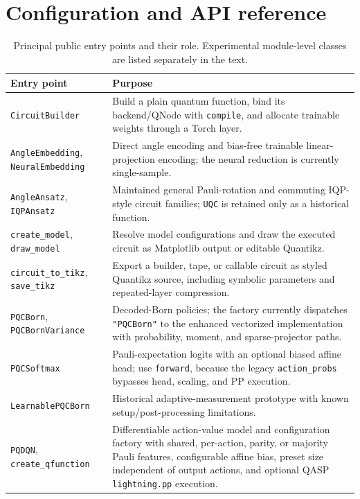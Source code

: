 \documentclass[10pt]{article}
\renewcommand{\arraystretch}{1.15}
\newcommand{\code}[1]{\texttt{#1}}
\begin{document}



\clearpage
\appendix

\section{Configuration and API reference}
\label{app:api}

\begin{table}[H]
\centering
\caption{Principal public entry points and their role.  Experimental module-level classes are listed separately in the text.}
\scriptsize
\renewcommand{\arraystretch}{1.03}
\begin{tabularx}{\textwidth}{@{}p{}X@{}}
\toprule
Entry point & Purpose \\
\midrule
\code{CircuitBuilder} & Build a plain quantum function, bind its backend/QNode with \code{compile}, and allocate trainable weights through a Torch layer. \\
\code{AngleEmbedding}, \code{NeuralEmbedding} & Direct angle encoding and bias-free trainable linear-projection encoding; the neural reduction is currently single-sample. \\
\code{AngleAnsatz}, \code{IQPAnsatz} & Maintained general Pauli-rotation and commuting IQP-style circuit families; \code{UQC} is retained only as a historical function. \\
\code{create\_model}, \code{draw\_model} & Resolve model configurations and draw the executed circuit as Matplotlib output or editable Quantikz. \\
\code{circuit\_to\_tikz}, \code{save\_tikz} & Export a builder, tape, or callable circuit as styled Quantikz source, including symbolic parameters and repeated-layer compression. \\
\code{PQCBorn}, \code{PQCBornVariance} & Decoded-Born policies; the factory currently dispatches \code{"PQCBorn"} to the enhanced vectorized implementation with probability, moment, and sparse-projector paths. \\
\code{PQCSoftmax} & Pauli-expectation logits with an optional biased affine head; use \code{forward}, because the legacy \code{action\_probs} bypasses head, scaling, and PP execution. \\
\code{LearnablePQCBorn} & Historical adaptive-measurement prototype with known setup/post-processing limitations. \\
\code{PQDQN}, \code{create\_qfunction} & Differentiable action-value model and configuration factory with shared, per-action, parity, or majority Pauli features, configurable affine bias, preset size independent of output actions, and optional QASP \code{lightning.pp} execution. \\

\end{tabularx}
\end{table}
\end{document}
